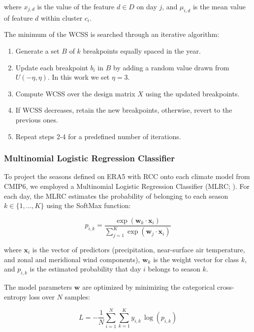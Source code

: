 where $x_{j,d}$ is the value of the feature $d \in D$ on day $j$, and $\mu_{i,d}$ is the mean value of feature $d$ within cluster $c_i$.

The minimum of the WCSS is searched through an iterative algorithm: 

\begin{enumerate}
    \item Generate a set $B$ of $k$ breakpoints equally spaced in the year.
    \item Update each breakpoint $b_i$ in $B$ by adding a random value drawn from $U(-\eta,\eta)$. In this work we set $\eta=3$.
    \item Compute WCSS over the design matrix $X$ using the updated breakpoints. 
    \item If WCSS decreases, retain the new breakpoints, otherwise, revert to the previous ones.
    \item Repeat steps 2-4 for a predefined number of iterations.
\end{enumerate}

\subsubsection{Multinomial Logistic Regression Classifier}

To project the seasons defined on ERA5 with RCC onto each climate model from CMIP6, we employed a Multinomial Logistic Regression Classifier (MLRC; \citet{hastie_elements_2009}). 
For each day, the MLRC estimates the probability of belonging to each season $k \in \{1,\dots,K\}$ using the SoftMax function:

\begin{linenomath*}
    \begin{equation}
        p_{i,k} = \frac{\exp(\mathbf{w}_k\cdot\mathbf{x}_i)}{\sum_{j=1}^{K} \exp(\mathbf{w}_j\cdot\mathbf{x}_i)}
    \end{equation}
\end{linenomath*}

where $\mathbf{x}_i$ is the vector of predictors (precipitation, near-surface air temperature, and zonal and meridional wind components), $\mathbf{w}_k$ is the weight vector for class $k$, and $p_{i,k}$ is the estimated probability that day $i$ belongs to season $k$.

The model parameters $\mathbf{w}$ are optimized by minimizing the categorical cross-entropy loss over $N$ samples:

\begin{linenomath*}
    \begin{equation}
        L = -\frac{1}{N} \sum_{i=1}^{N} \sum_{k=1}^{K} y_{i,k} \, \log(p_{i,k})
    \end{equation}
\end{linenomath*}

